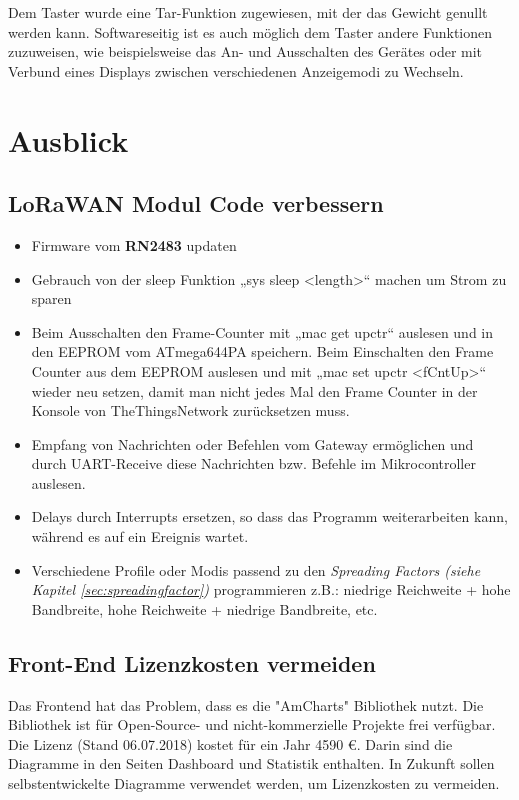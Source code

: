 Dem Taster wurde eine Tar-Funktion zugewiesen, mit der das Gewicht genullt werden kann. Softwareseitig ist es auch möglich dem Taster andere Funktionen zuzuweisen, wie beispielsweise das An- und Ausschalten des Gerätes oder mit Verbund eines Displays zwischen verschiedenen Anzeigemodi zu Wechseln.

\chapter{Ausblick}
\section{LoRaWAN Modul Code verbessern}
\begin{itemize}
    \item Firmware vom \textbf{RN2483} updaten
    \item Gebrauch von der sleep Funktion „sys sleep <length>“ machen um Strom zu sparen
    \item Beim Ausschalten den Frame-Counter mit „mac get upctr“ auslesen und in den EEPROM vom ATmega644PA speichern. Beim Einschalten den Frame Counter aus dem EEPROM auslesen und mit „mac set upctr <fCntUp>“ wieder neu setzen, damit man nicht jedes Mal den Frame Counter in der Konsole von TheThingsNetwork zurücksetzen muss. 
    \item Empfang von Nachrichten oder Befehlen vom Gateway ermöglichen und durch UART-Receive diese Nachrichten bzw. Befehle im Mikrocontroller auslesen. 
    \item Delays durch Interrupts ersetzen, so dass das Programm weiterarbeiten kann, während es auf ein Ereignis wartet.
    \item Verschiedene Profile oder Modis passend zu den \textit{Spreading Factors (siehe Kapitel \ref{sec:spreadingfactor})} programmieren z.B.: niedrige Reichweite + hohe Bandbreite, hohe Reichweite + niedrige Bandbreite, etc.
\end{itemize} 
\section{Front-End Lizenzkosten vermeiden}
Das Frontend hat das Problem, dass es die "AmCharts" Bibliothek nutzt. Die Bibliothek ist für Open-Source- und nicht-kommerzielle Projekte frei verfügbar. Die Lizenz (Stand 06.07.2018) kostet für ein Jahr 4590 \euro. Darin sind die Diagramme in den Seiten Dashboard und Statistik enthalten. In Zukunft sollen selbstentwickelte Diagramme verwendet werden, um Lizenzkosten zu vermeiden.
\newpage
